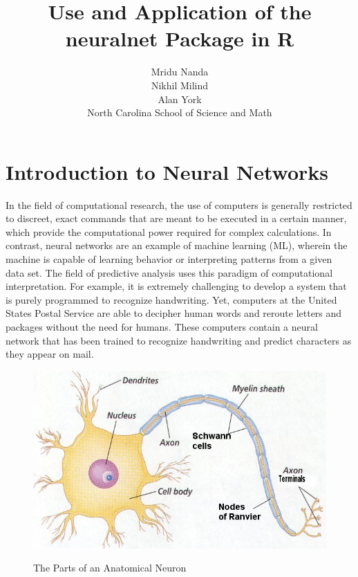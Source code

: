 \documentclass[11pt]{article}
\title{Use and Application of the neuralnet Package in R}
\author{Mridu Nanda \\ Nikhil Milind \\ Alan York \\ North Carolina School of Science and Math}
\begin{document}
\maketitle


\section{Introduction to Neural Networks}

In the field of computational research, the use of computers is generally restricted to discreet, exact commands that are meant to be executed in a certain manner, which  provide the computational power required for complex calculations. In contrast, neural networks are an example of machine learning (ML), wherein the machine is capable of learning behavior or interpreting patterns from a given data set. The field of predictive analysis uses this paradigm of computational interpretation. For example, it is extremely challenging to develop a system that is purely programmed to recognize handwriting. Yet, computers at the United States Postal Service are able to decipher human words and reroute letters and packages without the need for humans. These computers contain a neural network that has been trained to recognize handwriting and predict characters as they appear on mail. \cite{nielsen} \\

\begin{figure}[H]
   \centering
      \caption{The Parts of an Anatomical Neuron}
   \includegraphics[scale=0.75]{neuron.jpg} 
   \label{fig:neuron}
\end{figure}
\end{document}
